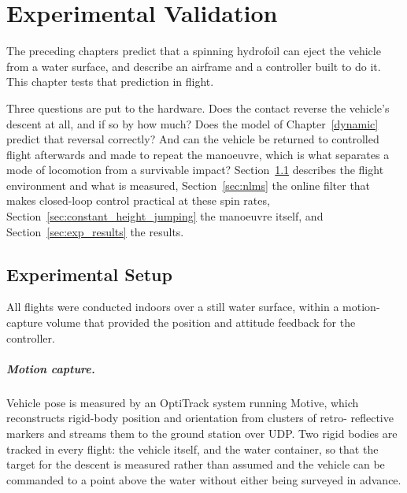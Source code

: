 \chapter{Experimental Validation}
\label{chapter:paperthree}

The preceding chapters predict that a spinning hydrofoil can eject the vehicle
from a water surface, and describe an airframe and a controller built to do it.
This chapter tests that prediction in flight.

Three questions are put to the hardware.  Does the contact reverse the
vehicle's descent at all, and if so by how much?  Does the model of
Chapter~\ref{dynamic} predict that reversal correctly?  And can the vehicle be
returned to controlled flight afterwards and made to repeat the manoeuvre,
which is what separates a mode of locomotion from a survivable impact?
Section~\ref{sec:exp_setup} describes the flight environment and what is
measured, Section~\ref{sec:nlms} the online filter that makes closed-loop
control practical at these spin rates,
Section~\ref{sec:constant_height_jumping} the manoeuvre itself, and
Section~\ref{sec:exp_results} the results.

\section{Experimental Setup}
\label{sec:exp_setup}

All flights were conducted indoors over a still water surface, within a
motion-capture volume that provided the position and attitude feedback for
the controller.

\paragraph{Motion capture.}
Vehicle pose is measured by an OptiTrack system running Motive, which
reconstructs rigid-body position and orientation from clusters of retro-%
reflective markers and streams them to the ground station over UDP.  Two
rigid bodies are tracked in every flight: the vehicle itself, and the water
container, so that the target for the descent is measured rather than assumed
and the vehicle can be commanded to a point above the water without either
being surveyed in advance.

